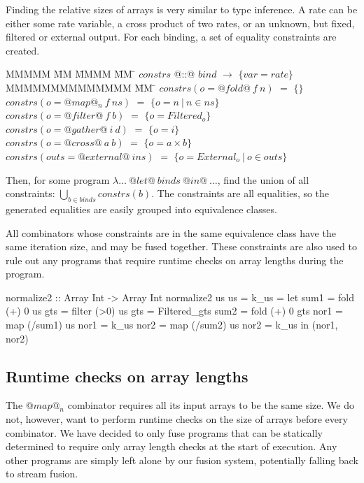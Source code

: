 Finding the relative sizes of arrays is very similar to type inference.
A rate can be either some rate variable, a cross product of two rates, or an unknown, but fixed, filtered or external output.
For each binding, a set of equality constraints are created.

\begin{tabbing}
MMMMM       \= MM \= MMMM \= MM \= \kill
$constrs$  \> @::@  \> $bind$  \> $\to$ \> $\{var = rate\}$ \\
MMMMMMMMMMMMMM               \= MM  \= \kill
$constrs(o = @fold@~f~n)  $ \> $=$ \> $\{\}$     \\
$constrs(o = @map@_n~f~ns)$ \> $=$ \> $\{o = n~|~n \in ns\}$     \\
$constrs(o = @filter@~f~b)$ \> $=$ \> $\{o = Filtered_o\}$              \\
$constrs(o = @gather@~i~d)$ \> $=$ \> $\{o = i\}$ \\
$constrs(o = @cross@~a~b) $ \> $=$ \> $\{o = a \times b\}$ \\
$constrs(outs = @external@~ins) $ \> $=$ \> $\{o = External_o~|~o \in outs\}$ \\
\end{tabbing}

Then, for some program $\lambda\ldots~@let@~binds~@in@~\ldots$, find the union of all constraints:
$\bigcup_{b \in binds} constrs(b)$.
The constraints are all equalities, so the generated equalities are easily grouped into equivalence classes.

All combinators whose constraints are in the same equivalence class have the same iteration size, and may be fused together.
These constraints are also used to rule out any programs that require runtime checks on array lengths during the program.


\begin{code}
 normalize2 :: Array Int -> Array Int
 normalize2 us                   {us   = k_us}
  = let sum1 = fold   (+) 0 us   
        gts  = filter (>0)  us   {gts  = Filtered_gts}
        sum2 = fold   (+) 0 gts   
        nor1 = map  (/sum1) us   {nor1 = k_us}
        nor2 = map  (/sum2) us   {nor2 = k_us}
    in (nor1, nor2)
\end{code}

\subsection{Runtime checks on array lengths}
The $@map@_n$ combinator requires all its input arrays to be the same size.
We do not, however, want to perform runtime checks on the size of arrays before every combinator.
We have decided to only fuse programs that can be statically determined to require only array length checks at the start of execution.
Any other programs are simply left alone by our fusion system, potentially falling back to stream fusion.

